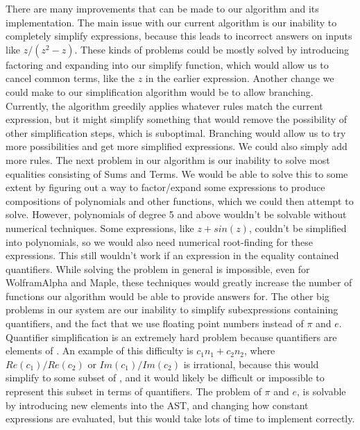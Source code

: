 There are many improvements that can be made to our algorithm and its implementation. The main issue with our current algorithm is our inability to completely simplify expressions, because this leads to incorrect answers on inputs like $z/(z^2-z)$. These kinds of problems could be mostly solved by introducing factoring and expanding into our simplify function, which would allow us to cancel common terms, like the $z$ in the earlier expression. Another change we could make to our simplification algorithm would be to allow branching. Currently, the algorithm greedily applies whatever rules match the current expression, but it might simplify something that would remove the possibility of other simplification steps, which is suboptimal. Branching would allow us to try more possibilities and get more simplified expressions. We could also simply add more rules. The next problem in our algorithm is our inability to solve most equalities consisting of Sums and Terms. We would be able to solve this to some extent by figuring out a way to factor/expand some expressions to produce compositions of polynomials and other functions, which we could then attempt to solve. However, polynomials of degree 5 and above wouldn't be solvable without numerical techniques. Some expressions, like $z+sin(z)$, couldn't be simplified into polynomials, so we would also need numerical root-finding for these expressions. This still wouldn't work if an expression in the equality contained quantifiers. While solving the problem in general is impossible, even for WolframAlpha and Maple, these techniques would greatly increase the number of functions our algorithm would be able to provide answers for. The other big problems in our system are our inability to simplify subexpressions containing quantifiers, and the fact that we use floating point numbers instead of $\pi$ and $e$. Quantifier simplification is an extremely hard problem because quantifiers are elements of \ZZ. An example of this difficulty is $c_1n_1+c_2n_2$, where $Re(c_1)/Re(c_2)$ or $Im(c_1)/Im(c_2)$ is irrational, because this would simplify to some subset of \CC, and it would likely be difficult or impossible to represent this subset in terms of quantifiers. The problem of $\pi$ and $e$, is solvable by introducing new elements into the AST, and changing how constant expressions are evaluated, but this would take lots of time to implement correctly. 
